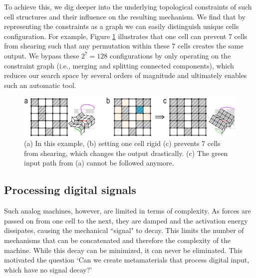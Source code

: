 To achieve this, we dig deeper into the underlying topological constraints of such cell structures and their influence on the resulting mechanism. 
We find that by representing the constraints as a graph we can easily distinguish unique cells configuration. 
For example, Figure \ref{fig:2-1-understanding-constraint-interaction} illustrates that one cell can prevent 7 cells from shearing such that any permutation within these 7 cells creates the same output. 
We bypass these $2^7 = 128$ configurations by only operating on the constraint graph (i.e., merging and splitting connected components), which reduces our search space by several orders of magnitude and ultimately enables such an automatic tool.


\begin{figure} [h] %
    \centering
    \includegraphics[width=1\textwidth]{chapters/introduction-FIG/2-1-understanding-constraint-interaction.png}
    \caption[Short figure name.]{(a) In this example, (b) setting one cell rigid (c) prevents 7 cells from shearing, which changes the output drastically. (c) The green input path from (a) cannot be followed anymore.
    \label{fig:2-1-understanding-constraint-interaction}}
\end{figure}


\subsection{Processing digital signals}

Such analog machines, however, are limited in terms of complexity. As forces are passed on from one cell to the next, they are damped and the activation energy dissipates, causing the mechanical ``signal" to decay. This limits the number of mechanisms that can be concatenated and therefore the complexity of the machine. While this decay can be minimized, it can never be eliminated. This motivated the question `Can we create metamaterials that process digital input, which have no signal decay?' 

